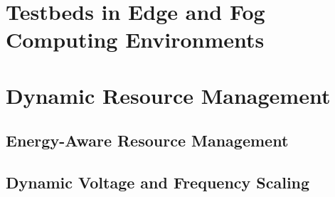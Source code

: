 \section{Testbeds in Edge and Fog Computing Environments}
\label{sec:testbeds_in_edge_and_fog_computing_environments}

\section{Dynamic Resource Management}
\label{sec:dynamic_resource_management}

\subsection{Energy-Aware Resource Management}
\label{sec:energy-aware_resource_management}

\subsection{Dynamic Voltage and Frequency Scaling}
\label{sec:dynamic_voltage_and_frequency_scaling}

